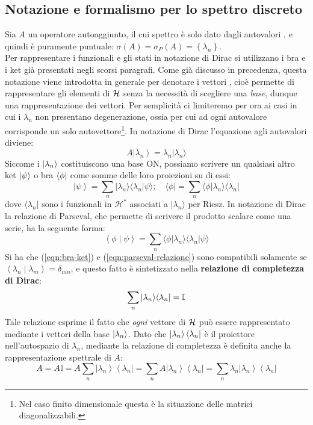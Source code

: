 \documentclass[../../FisicaTeorica.tex]{subfiles}
\begin{document}
\subsection{Notazione e formalismo per lo spettro discreto}
Sia $A$ un operatore autoaggiunto, il cui spettro è solo dato dagli autovalori , e quindi è puramente puntuale: $\sigma \left(A\right)= \sigma_P\left(A\right)= \left\{\lambda_n\right\}$.\\
Per rappresentare i funzionali e gli stati in notazione di Dirac si utilizzano i bra e i ket già presentati negli scorsi paragrafi.
Come già discusso in precedenza, questa notazione viene introdotta in generale per denotare i vettori , cioè permette di rappresentare gli elementi di $\mathcal{H}$ senza la necessità di scegliere una \emph{base}, dunque una rappresentazione  dei vettori.
Per semplicità ci limiteremo per ora ai casi in cui i $\lambda_n$ non presentano degenerazione, ossia per cui ad ogni autovalore corrisponde un solo autovettore\footnote{Nel caso finito dimensionale questa è la situazione delle matrici diagonalizzabili.}.
In notazione di Dirac l'equazione agli autovalori diviene:
\[
A \left|\lambda_n\right\rangle=\lambda_n|\lambda_n \rangle 
\]
Siccome i $\ket{\lambda_n}$ costituiscono una base ON, possiamo scrivere un qualsiasi altro ket $\ket{\psi}$ o bra $\bra{\phi}$ come somme delle loro proiezioni su di essi:
\begin{equation}
\left|\psi\right\rangle=\sum_{n}{|\lambda_n\rangle \langle\lambda_n|\psi\rangle }; \quad 
\langle \phi |=\sum_{n}{\langle\phi|\lambda_n\rangle \langle\lambda_n|}
\label{eqn:bra-ket}
\end{equation}
dove $\langle \lambda_n|$ sono i funzionali in $\mathcal{H}^\ast$ associati a $|\lambda_n \rangle$  per Riesz. In notazione di Dirac la relazione di Parseval, che permette di scrivere il prodotto scalare come una serie, ha la seguente forma:
\begin{equation}
\left\langle\phi\middle|\psi\right\rangle=\sum_{n}{\langle\phi|\lambda_n\rangle \langle\lambda_n|\psi\rangle }
\label{eqn:parseval-relazione}
\end{equation}
Si ha che (\ref{eqn:bra-ket}) e (\ref{eqn:parseval-relazione}) sono compatibili solamente se $\left\langle\lambda_n\middle|\lambda_m\right\rangle=\delta_{mn}$, e questo fatto è sintetizzato nella \textbf{relazione di completezza di Dirac}:
\[
\sum_{n}{|\lambda_n\rangle \langle\lambda_n|}=\mathbb{I}
\]
Tale relazione esprime il fatto che \emph{ogni} vettore di $\mathcal{H}$ può essere rappresentato mediante i vettori della base $\ket{\lambda_n}$.
Dato che $\ket{\lambda_n} \bra{\lambda_n}$ è il proiettore nell'autospazio di $\lambda_n$, mediante la relazione di completezza è definita anche la rappresentazione spettrale di $A$:
\[
A = A \mathbb I = A\sum_{n}{\left|\lambda_n\right\rangle\left\langle\lambda_n\right|} = \sum_{n}{A \left|\lambda_n\right\rangle\left\langle\lambda_n\right| = \sum_{n}{\lambda_n\left|\lambda_n\right\rangle\left\langle\lambda_n\right|}}
\]
\end{document}

